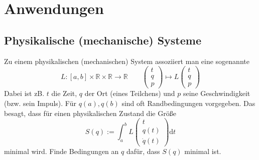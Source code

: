 \section{Anwendungen} %
\label{sec:10}

\subsection{Physikalische (mechanische) Systeme} %
\label{sub:101}
Zu einem physikalischen (mechanischen) System assoziiert man eine sogenannte   
\[
	L : [a,b] \times \mathds{R} \times \mathds{R} \to \mathds{R} \qquad \begin{pmatrix}
		t \\ q\\ p
	\end{pmatrix} \mapsto L \begin{pmatrix}
		t \\ q\\ p
	\end{pmatrix}
\]
Dabei ist zB. $t$ die Zeit, $q$ der Ort (eines Teilchens) und $p$ seine Geschwindigkeit (bzw. sein Impuls). Für $q(a), q(b)$ sind oft Randbedingungen vorgegeben.
Das  besagt, dass für einen physikalischen Zustand die Größe 
\[
	S(q) :=  \int_{a} ^{b} \! L \begin{pmatrix}
		t \\ q(t) \\ \dot q(t)
	\end{pmatrix}  \mathrm{d}t
\]
minimal wird.
 Finde Bedingungen an $q$ dafür, dass $S(q)$ minimal ist.

